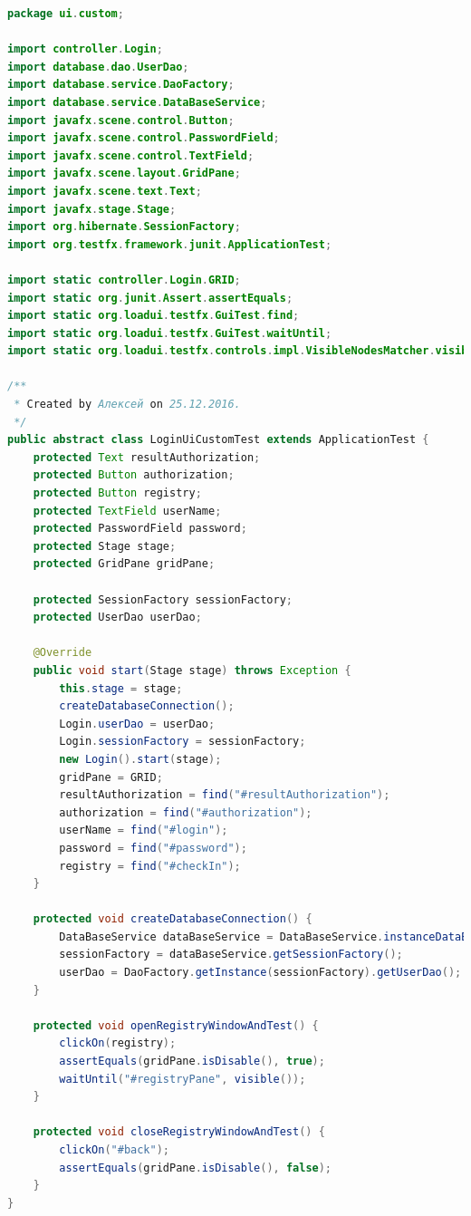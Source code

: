 \documentclass[a4paper,12pt]{article}
\begin{document}
\begin{lstlisting}[language=java, caption=код модуля LoginUiCustomTest.java]
package ui.custom;

import controller.Login;
import database.dao.UserDao;
import database.service.DaoFactory;
import database.service.DataBaseService;
import javafx.scene.control.Button;
import javafx.scene.control.PasswordField;
import javafx.scene.control.TextField;
import javafx.scene.layout.GridPane;
import javafx.scene.text.Text;
import javafx.stage.Stage;
import org.hibernate.SessionFactory;
import org.testfx.framework.junit.ApplicationTest;

import static controller.Login.GRID;
import static org.junit.Assert.assertEquals;
import static org.loadui.testfx.GuiTest.find;
import static org.loadui.testfx.GuiTest.waitUntil;
import static org.loadui.testfx.controls.impl.VisibleNodesMatcher.visible;

/**
 * Created by Алексей on 25.12.2016.
 */
public abstract class LoginUiCustomTest extends ApplicationTest {
    protected Text resultAuthorization;
    protected Button authorization;
    protected Button registry;
    protected TextField userName;
    protected PasswordField password;
    protected Stage stage;
    protected GridPane gridPane;

    protected SessionFactory sessionFactory;
    protected UserDao userDao;

    @Override
    public void start(Stage stage) throws Exception {
        this.stage = stage;
        createDatabaseConnection();
        Login.userDao = userDao;
        Login.sessionFactory = sessionFactory;
        new Login().start(stage);
        gridPane = GRID;
        resultAuthorization = find("#resultAuthorization");
        authorization = find("#authorization");
        userName = find("#login");
        password = find("#password");
        registry = find("#checkIn");
    }

    protected void createDatabaseConnection() {
        DataBaseService dataBaseService = DataBaseService.instanceDataBaseService();
        sessionFactory = dataBaseService.getSessionFactory();
        userDao = DaoFactory.getInstance(sessionFactory).getUserDao();
    }

    protected void openRegistryWindowAndTest() {
        clickOn(registry);
        assertEquals(gridPane.isDisable(), true);
        waitUntil("#registryPane", visible());
    }

    protected void closeRegistryWindowAndTest() {
        clickOn("#back");
        assertEquals(gridPane.isDisable(), false);
    }
}
\end{lstlisting}
\end{document}
